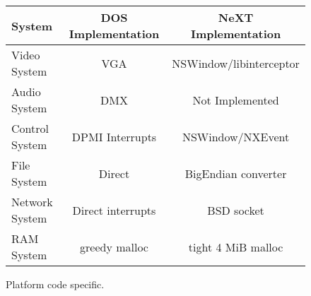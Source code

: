  \begin{figure}[H]
\centering  
\begin{tabularx}{\textwidth}{ L{0.22} | C{0.39} | C{0.39} }
  \toprule
  \textbf{System} & \textbf{DOS Implementation} & \textbf{NeXT Implementation}\\
  \toprule 
    Video System & VGA & NSWindow/libinterceptor\\
    Audio System & DMX & Not Implemented\\
    Control System & DPMI Interrupts & NSWindow/NXEvent \\
    File System & Direct & BigEndian converter\\
    Network System & Direct interrupts & BSD socket \\
    RAM System & greedy malloc & tight 4 MiB malloc\\
   \toprule
\end{tabularx}
\caption{Platform code specific.}
\end{figure}

\par

